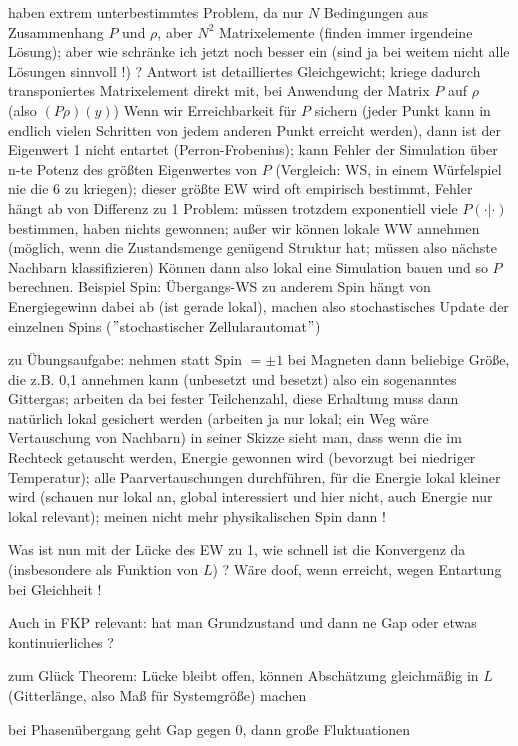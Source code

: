 haben extrem unterbestimmtes Problem, da nur $N$ Bedingungen aus Zusammenhang $P$ und $\rho$, aber $N^2$ Matrixelemente (finden immer irgendeine Lösung); aber wie schränke ich jetzt noch besser ein (sind ja bei weitem nicht alle Lösungen sinnvoll !) ? Antwort ist detailliertes Gleichgewicht; kriege dadurch transponiertes Matrixelement direkt mit, bei Anwendung der Matrix $P$ auf $\rho$ (also $(P\rho)(y)$)
Wenn wir Erreichbarkeit für $P$ sichern (jeder Punkt kann in endlich vielen Schritten von jedem anderen Punkt erreicht werden), dann ist der Eigenwert 1 nicht entartet (Perron-Frobenius); kann Fehler der Simulation über n-te Potenz des größten Eigenwertes von $P$ (Vergleich: WS, in einem Würfelspiel nie die 6 zu kriegen); dieser größte EW wird oft empirisch bestimmt, Fehler hängt ab von Differenz zu 1
Problem: müssen trotzdem exponentiell viele $P(\cdot|\cdot)$ bestimmen, haben nichts gewonnen; außer wir können lokale WW annehmen (möglich, wenn die Zustandsmenge genügend Struktur hat; müssen also nächste Nachbarn klassifizieren)
Können dann also lokal eine Simulation bauen und so $P$ berechnen. Beispiel Spin: Übergangs-WS zu anderem Spin hängt von Energiegewinn dabei ab (ist gerade lokal), machen also stochastisches Update der einzelnen Spins ($"$stochastischer Zellularautomat$"$)

zu Übungsaufgabe: nehmen statt Spin $=\pm 1$ bei Magneten dann beliebige Größe, die z.B. 0,1 annehmen kann (unbesetzt und besetzt) also ein sogenanntes Gittergas; arbeiten da bei fester Teilchenzahl, diese Erhaltung muss dann natürlich lokal gesichert werden (arbeiten ja nur lokal; ein Weg wäre Vertauschung von Nachbarn)
in seiner Skizze sieht man, dass wenn die im Rechteck getauscht werden, Energie gewonnen wird (bevorzugt bei niedriger Temperatur); alle Paarvertauschungen durchführen, für die Energie lokal kleiner wird (schauen nur lokal an, global interessiert und hier nicht, auch Energie nur lokal relevant); meinen nicht mehr physikalischen Spin dann !

Was ist nun mit der Lücke des EW zu 1, wie schnell ist die Konvergenz da (insbesondere als Funktion von $L$) ? Wäre doof, wenn erreicht, wegen Entartung bei Gleichheit !

Auch in FKP relevant: hat man Grundzustand und dann ne Gap oder etwas kontinuierliches ?

zum Glück Theorem: Lücke bleibt offen, können Abschätzung gleichmäßig in $L$ (Gitterlänge, also Maß für Systemgröße) machen

bei Phasenübergang geht Gap gegen 0, dann große Fluktuationen



